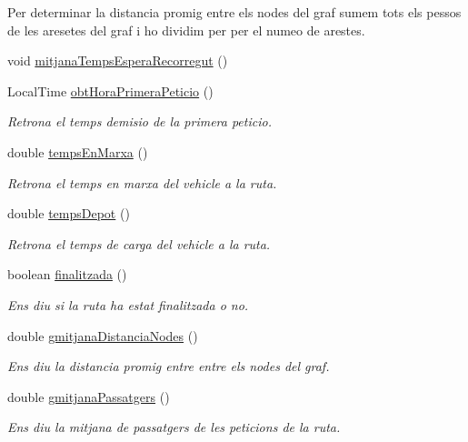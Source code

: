 \begin{DoxyCompactItemize}
\begin{DoxyCompactList}
 Per determinar la distancia promig entre els nodes del graf sumem tots els pessos de les aresetes del graf i ho dividim per per el numeo de arestes. \end{DoxyCompactList}\item 
void \hyperlink{class_portam_a_pro_p_1_1_ruta_a59ca173f24b9b180ae97cb5c1d7b25e3}{mitjana\+Temps\+Espera\+Recorregut} ()
\item 
Local\+Time \hyperlink{class_portam_a_pro_p_1_1_ruta_a1c55ea94e7f905523f8fca83fafa6eff}{obt\+Hora\+Primera\+Peticio} ()
\begin{DoxyCompactList}\small\item\em Retrona el temps d\textquotesingle{}emisio de la primera peticio. \end{DoxyCompactList}\item 
double \hyperlink{class_portam_a_pro_p_1_1_ruta_a6cfb254ff066e62ac3373ae5e7eb28ba}{temps\+En\+Marxa} ()
\begin{DoxyCompactList}\small\item\em Retrona el temps en marxa del vehicle a la ruta. \end{DoxyCompactList}\item 
double \hyperlink{class_portam_a_pro_p_1_1_ruta_ae5415a9448cd8cb22835016e95718a0c}{temps\+Depot} ()
\begin{DoxyCompactList}\small\item\em Retrona el temps de carga del vehicle a la ruta. \end{DoxyCompactList}\item 
boolean \hyperlink{class_portam_a_pro_p_1_1_ruta_a4a0c82de5c63d5e3df05470d80078868}{finalitzada} ()
\begin{DoxyCompactList}\small\item\em Ens diu si la ruta ha estat finalitzada o no. \end{DoxyCompactList}\item 
double \hyperlink{class_portam_a_pro_p_1_1_ruta_af6470e14e390b3394c084cbbec33cd7f}{gmitjana\+Distancia\+Nodes} ()
\begin{DoxyCompactList}\small\item\em Ens diu la distancia promig entre entre els nodes del graf. \end{DoxyCompactList}\item 
double \hyperlink{class_portam_a_pro_p_1_1_ruta_acef34ba8914120054ac66f585072cbc4}{gmitjana\+Passatgers} ()
\begin{DoxyCompactList}\small\item\em Ens diu la mitjana de passatgers de les peticions de la ruta. \end{DoxyCompactList}\item 

\end{DoxyCompactItemize}

